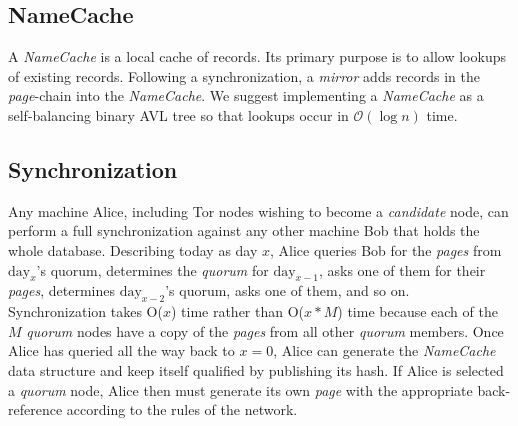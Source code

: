 \subsection{NameCache}
\label{sec:NameCache}

A \emph{NameCache} is a local cache of records. Its primary purpose is to allow lookups of existing records. Following a synchronization, a \emph{mirror} adds records in the \emph{page}-chain into the \emph{NameCache}. We suggest implementing a \emph{NameCache} as a self-balancing binary AVL tree so that lookups occur in $ \mathcal{O}(\log{}n) $ time.


\subsection{Synchronization}
\label{sec:Synchronization}


Any machine Alice, including Tor nodes wishing to become a \emph{candidate} node, can perform a full synchronization against any other machine Bob that holds the whole database. Describing today as day $ x $, Alice queries Bob for the \emph{pages} from $ \textrm{day}_{x} $'s quorum, determines the \emph{quorum} for $ \textrm{day}_{x-1} $, asks one of them for their \emph{pages}, determines $ \textrm{day}_{x-2} $'s quorum, asks one of them, and so on. Synchronization takes O($ x $) time rather than O($ x * M $) time because each of the $ M $ \emph{quorum} nodes have a copy of the \emph{pages} from all other \emph{quorum} members. Once Alice has queried all the way back to $ x = 0 $, Alice can generate the \emph{NameCache} data structure and keep itself qualified by publishing its hash. If Alice is selected a \emph{quorum} node, Alice then must generate its own \emph{page} with the appropriate back-reference according to the rules of the network.


